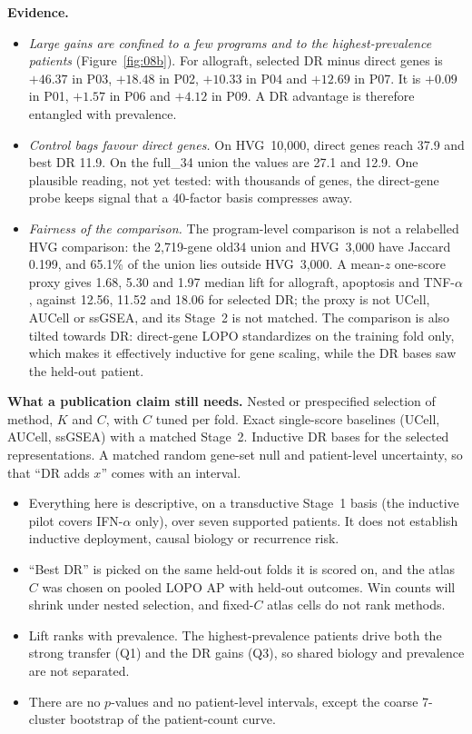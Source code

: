 \textbf{Evidence.}
\begin{itemize}
\item \emph{Large gains are confined to a few programs and to the highest-prevalence patients} (Figure~\ref{fig:08b}). For allograft, selected DR minus direct genes is $+46.37$\pp{} in P03, $+18.48$ in P02, $+10.33$ in P04 and $+12.69$ in P07. It is $+0.09$ in P01, $+1.57$ in P06 and $+4.12$ in P09. A DR advantage is therefore entangled with prevalence. 
\item \emph{Control bags favour direct genes.} On HVG~10,000, direct genes reach 37.9\pp{} and best DR 11.9\pp. On the full\_34 union the values are 27.1 and 12.9\pp. One plausible reading, not yet tested: with thousands of genes, the direct-gene probe keeps signal that a 40-factor basis compresses away. 
\item \emph{Fairness of the comparison.} The program-level comparison is not a relabelled HVG comparison: the 2,719-gene old34 union and HVG~3,000 have Jaccard 0.199, and 65.1\% of the union lies outside HVG~3,000. A mean-$z$ one-score proxy gives 1.68, 5.30 and 1.97\pp{} median lift for allograft, apoptosis and TNF-$\alpha$, against 12.56, 11.52 and 18.06\pp{} for selected DR; the proxy is not UCell, AUCell or ssGSEA, and its Stage~2 is not matched. The comparison is also tilted towards DR: direct-gene LOPO standardizes on the training fold only, which makes it effectively inductive for gene scaling, while the DR bases saw the held-out patient. 
\end{itemize}

\textbf{What a publication claim still needs.} Nested or prespecified selection of method, $K$ and $C$, with $C$ tuned per fold. Exact single-score baselines (UCell, AUCell, ssGSEA) with a matched Stage~2. Inductive DR bases for the selected representations. A matched random gene-set null and patient-level uncertainty, so that ``DR adds $x$\pp'' comes with an interval.

\begin{caveatbox}
\begin{itemize}
\item Everything here is descriptive, on a transductive Stage~1 basis (the inductive pilot covers IFN-$\alpha$ only), over seven supported patients. It does not establish inductive deployment, causal biology or recurrence risk.
\item ``Best DR'' is picked on the same held-out folds it is scored on, and the atlas $C$ was chosen on pooled LOPO AP with held-out outcomes. Win counts will shrink under nested selection, and fixed-$C$ atlas cells do not rank methods.
\item Lift ranks with prevalence. The highest-prevalence patients drive both the strong transfer (Q1) and the DR gains (Q3), so shared biology and prevalence are not separated.
\item There are no $p$-values and no patient-level intervals, except the coarse 7-cluster bootstrap of the patient-count curve.
\end{itemize}
\end{caveatbox}

